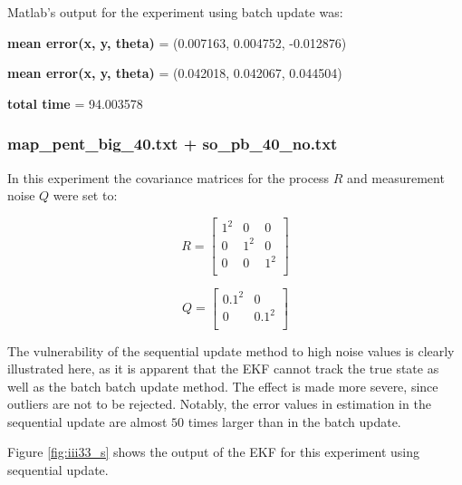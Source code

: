 Matlab's output for the experiment using batch update was:

\textbf{mean error(x, y, theta)} = (0.007163, 0.004752, -0.012876)

\textbf{mean error(x, y, theta)} = (0.042018, 0.042067, 0.044504)

\textbf{total time} = 94.003578



\subsubsection{map\_pent\_big\_40.txt + so\_pb\_40\_no.txt}

In this experiment the covariance matrices for the process $R$ and measurement noise $Q$ were set to:

\[
R =
\begin{bmatrix}
    1^2  	& 0			& 0 \\
    0       & 1^2 		& 0 \\
    0       & 0 		& 1^2 \\

\end{bmatrix}
\]


\[
Q =
\begin{bmatrix}
    0.1^2  & 0 \\
    0      & 0.1^2 \\

\end{bmatrix}
\]


The vulnerability of the sequential update method to high noise values is clearly illustrated here,
as it is apparent that the EKF cannot track the true state as well as the batch batch update method.
The effect is made more severe, since outliers are not to be rejected.
Notably, the error values in estimation in the sequential update are almost $50$ times larger than
in the batch update.

Figure \ref{fig:iii33_s} shows the output of the EKF for this experiment using sequential update.

